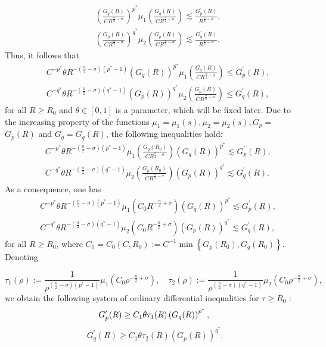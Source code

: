 \documentclass[11pt,reqno]{amsart}
\newcommand{\tron}[1]{\left( #1 \right)}
\numberwithin{equation}{section}
\theoremstyle{plain}
\begin{document}
$$
\begin{aligned}
& \left(\frac{G_q(R)}{CR^{\frac{n}{2}-\sigma}}\right)^{p^*} \mu_1\left(\frac{G_q(R) }{CR^{\frac{n}{2}-\sigma}}\right) \lesssim \frac{G_p^{\prime}(R)}{R^{\frac{n}{2}-\sigma}}, \\
& \left(\frac{G_p(R)}{CR^{\frac{n}{2}-\sigma}}\right)^{q^*} \mu_2\left(\frac{G_p(R)}{CR^{\frac{n}{2}-\sigma}}\right) \lesssim \frac{G_q^{\prime}(R)}{R^{\frac{n}{2}-\sigma}}.
\end{aligned}
$$
Thus, it follows that
$$
\begin{aligned}
& C^{-p^*}\theta R^{-({\frac{n}{2}-\sigma})(p^*-1)}\tron{G_q(R) }^{p^*}\mu_1\left(\frac{G_q(R) }{CR^{\frac{n}{2}-\sigma}}\right) \leq G_p^{\prime}(R), \\
& C^{-q^*}\theta R^{-({\frac{n}{2}-\sigma})(q^*-1)}\tron{G_p(R) }^{q^*}\mu_2\left(\frac{G_p(R)  }{CR^{\frac{n}{2}-\sigma}}\right) \leq G_q^{\prime}(R),
\end{aligned}
$$
for all $R \geq R_0$ and $\theta\in [0,1]$ is a parameter, which will be fixed later. Due to the increasing property of the functions $\mu_1=\mu_1(s), \mu_2=\mu_2(s), G_p=$ $G_p(R)$ and $G_q=G_q(R)$, the following inequalities hold:
$$
\begin{aligned}
& C^{-p^*}\theta R^{-({\frac{n}{2}-\sigma})(p^*-1)}\mu_1\left(\frac{G_q\left(R_0\right)}{CR^{\frac{n}{2}-\sigma}}\right)\left(G_q(R)\right)^{p^*} \lesssim G_p^{\prime}(R), \\
& C^{-q^*}\theta R^{-({\frac{n}{2}-\sigma})(q^*-1)} \mu_2\left(\frac{G_p\left(R_0\right)}{CR^{\frac{n}{2}-\sigma}}\right)\left(G_p(R)\right)^{q^*} \lesssim G_q^{\prime}(R).
\end{aligned}
$$
As a consequence, one has
$$
\begin{aligned}
& C^{-p^*}\theta R^{-({\frac{n}{2}-\sigma})(p^*-1)}\mu_1\left(C_0 R^{-\frac{n}{2}+\sigma}\right)\left(G_q(R)\right)^{p^*} \lesssim G_p^{\prime}(R), \\
& C^{-q^*}\theta R^{-({\frac{n}{2}-\sigma})(q^*-1)}\mu_2\left(C_0 R^{-\frac{n}{2}+\sigma}\right)\left(G_p(R)\right)^{q^*} \lesssim G_q^{\prime}(R),
\end{aligned}
$$
for all $R\geq R_0$, where $C_0=C_0\left(C, R_0\right):=C^{-1}\min \left\{G_p\left(R_0\right), G_q\left(R_0\right)\right\}$. Denoting

$$
\tau_1(\rho):=\frac{1}{{\rho}^{({\frac{n}{2}-\sigma})(p^*-1)}} \mu_1\left(C_0 \rho^{-\frac{n}{2}+\sigma}\right), \quad \tau_2(\rho):=\frac{1}{{\rho}^{({\frac{n}{2}-\sigma})(q^*-1)}}\mu_2\left(C_0 \rho^{-\frac{n}{2}+\sigma}\right),
$$
we obtain the following system of ordinary differential inequalities for $\tau \geq R_0$ :
\begin{equation}\label{eq17sec3.2}
G_p^{\prime}(R) \geq C_1\theta \tau_1(R)\left(G_q(R)\right)^{p^*}, \\
\end{equation}
\begin{equation}\label{eq18sec3.2}
G_q^{\prime}(R) \geq C_1 \theta\tau_2(R)\left(G_p(R)\right)^{q^*}.
\end{equation}
\end{document}
